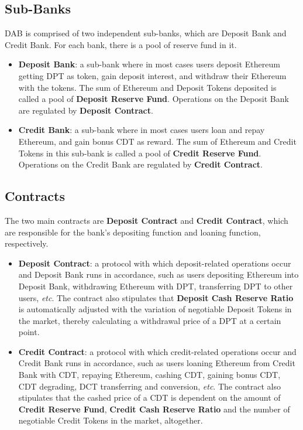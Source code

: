 \documentclass[review]{elsarticle}
\begin{document}
\subsection{Sub-Banks}
DAB is comprised of two independent sub-banks, which are Deposit Bank and Credit Bank. For each bank, there is a pool of reserve fund in it.
\begin{itemize} 
   \item \textbf{Deposit Bank}: a sub-bank where in most cases users deposit Ethereum getting DPT as token, gain deposit interest, and withdraw their Ethereum with the tokens. The sum of Ethereum and Deposit Tokens deposited is called a pool of \textbf{Deposit Reserve Fund}. Operations on the Deposit Bank are regulated by \textbf{Deposit Contract}.
   \item \textbf{Credit Bank}: a sub-bank where in most cases users loan and repay Ethereum, and gain bonus CDT as reward. The sum of Ethereum and Credit Tokens in this sub-bank is called a pool of \textbf{Credit Reserve Fund}. Operations on the Credit Bank are regulated by \textbf{Credit Contract}.
\end{itemize}

\subsection{Contracts}
The two main contracts are \textbf{Deposit Contract} and \textbf{Credit Contract}, which are responsible for the bank's depositing function and loaning function, respectively.

\begin{itemize} 
   \item \textbf{Deposit Contract}: a protocol with which deposit-related operations occur and Deposit Bank runs in accordance, such as users depositing Ethereum into Deposit Bank, withdrawing Ethereum with DPT, transferring DPT to other users, \emph{etc}. The contract also stipulates that \textbf{Deposit Cash Reserve Ratio} is automatically adjusted with the variation of negotiable Deposit Tokens in the market, thereby calculating a withdrawal price of a DPT at a certain point.
   \item \textbf{Credit Contract}: a protocol with which credit-related operations occur and Credit Bank runs in accordance, such as users loaning Ethereum from Credit Bank with CDT, repaying Ethereum, cashing CDT, gaining bonus CDT, CDT degrading, DCT transferring and conversion, \emph{etc}. The contract also stipulates that the cashed price of a CDT is dependent on the amount of \textbf{Credit Reserve Fund}, \textbf{Credit Cash Reserve Ratio} and the number of negotiable Credit Tokens in the market, altogether.
\end{itemize}
\end{document}
